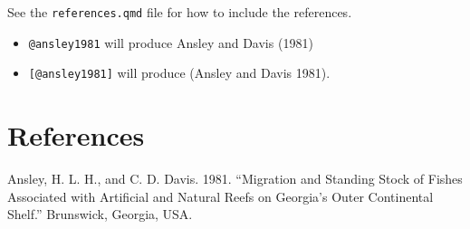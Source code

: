 \documentclass[
  letterpaper,
  oneside,
  open=any]{scrbook}
\newlength{\cslhangindent}
\newenvironment{CSLReferences}[2] %
 {\begin{list}{}{%
  \setlength{\itemindent}{0pt}
  \setlength{\leftmargin}{0pt}
  \setlength{\parsep}{0pt}
  \ifodd #1
   \setlength{\leftmargin}{\cslhangindent}
   \setlength{\itemindent}{-1\cslhangindent}
  \fi
  \setlength{\itemsep}{#2\baselineskip}}}
 {\end{list}}
\begin{document}
See the \texttt{references.qmd} file for how to include the references.

\begin{itemize}
\item
  \texttt{@ansley1981} will produce Ansley and Davis (1981)
\item
  \texttt{{[}@ansley1981{]}} will produce (Ansley and Davis 1981).
\end{itemize}


\chapter*{References}\label{references-1}


\label{refs}
\begin{CSLReferences}{1}{0}
Ansley, H. L. H., and C. D. Davis. 1981. {``Migration and Standing Stock
of Fishes Associated with Artificial and Natural Reefs on Georgia{'}s
Outer Continental Shelf.''} Brunswick, Georgia, USA.

\end{CSLReferences}


\backmatter
\end{document}
